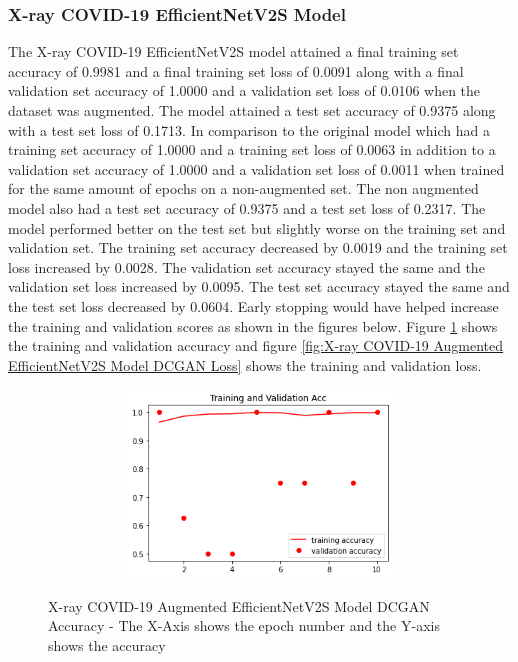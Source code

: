 \subsubsection{X-ray COVID-19 EfficientNetV2S Model}
The X-ray COVID-19 EfficientNetV2S model attained a final training set accuracy of 0.9981  and a final training set loss of 0.0091 along with a final validation set accuracy of 1.0000 and a validation set loss of 0.0106 when the dataset was augmented.  The model attained a test set accuracy of 0.9375 along with a test set loss of 0.1713.  In comparison to the original model which had a training set accuracy of 1.0000 and a training set loss of 0.0063 in addition to a validation set accuracy of 1.0000 and a validation set loss of 0.0011  when trained for the same amount of epochs on a non-augmented set.  The non augmented model also had a test set accuracy of 0.9375 and a test set loss of 0.2317.  The model performed better on the test set but slightly worse on the training set and validation set.  The training set accuracy decreased by 0.0019 and the training set loss increased by 0.0028. The validation set accuracy stayed the same and the validation set loss increased by 0.0095.  The test set accuracy stayed the same and the test set loss decreased by 0.0604.  Early stopping would have helped increase the training and validation scores as shown in the figures below.  Figure \ref{fig:X-ray COVID-19 Augmented EfficientNetV2S Model DCGAN Accuracy} shows the training and validation accuracy and figure \ref{fig:X-ray COVID-19 Augmented EfficientNetV2S Model DCGAN Loss} shows the training and validation loss.
 \begin{figure}[H]
    \centering    
    \includegraphics[width=1\textwidth,height=5cm,keepaspectratio]{Images/EfficientNetV2SBaselineTrainingValidationAccXRayCOVID19AugmentedDCGAN.png}\\
    \caption{X-ray COVID-19 Augmented EfficientNetV2S Model DCGAN Accuracy - The X-Axis shows the epoch number and the Y-axis shows the accuracy}
    \label{fig:X-ray COVID-19 Augmented EfficientNetV2S Model DCGAN Accuracy}
\end{figure}
